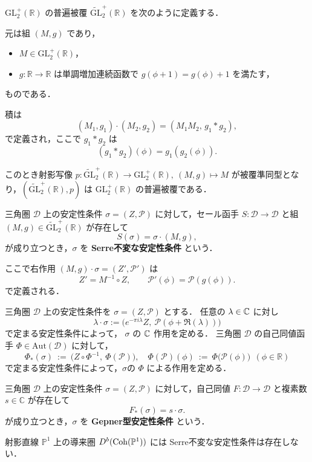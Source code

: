 \section{}
\begin{defn}
$\mathrm{GL}^+_2(\mathbb{R})$ の普遍被覆 $\widetilde{\mathrm{GL}}^+_2(\mathbb{R})$ を次のように定義する．

元は組 $(M,g)$ であり，
\begin{itemize}
  \item $M \in \mathrm{GL}^+_2(\mathbb{R})$，
  \item $g:\mathbb{R}\to\mathbb{R}$ は単調増加連続函数で $g(\phi+1)=g(\phi)+1$ を満たす，
\end{itemize}
ものである．

積は
\[
(M_1,g_1)\cdot(M_2,g_2) = (M_1M_2,\, g_1\ast g_2),
\]
で定義され，ここで $g_1\ast g_2$ は
\[
(g_1\ast g_2)(\phi) = g_1(g_2(\phi)).
\]

このとき射影写像 $p:\widetilde{\mathrm{GL}}^+_2(\mathbb{R})\to \mathrm{GL}^+_2(\mathbb{R}),\ (M,g)\mapsto M$ が被覆準同型となり，$(\widetilde{\mathrm{GL}}^+_2(\mathbb{R}),p)$ は $\mathrm{GL}^+_2(\mathbb{R})$ の普遍被覆である．
\end{defn}

\begin{defn}
三角圏 $\mathcal{D}$ 上の安定性条件 $\sigma=(Z,\mathcal{P})$ に対して，セール函手 $S:\mathcal{D}\to\mathcal{D}$ と組 $(M,g)\in \widetilde{\mathrm{GL}}^+_2(\mathbb{R})$ が存在して
\[
S(\sigma)=\sigma \cdot (M,g),
\]
が成り立つとき，$\sigma$ を \textbf{Serre不変な安定性条件} という．

ここで右作用 $(M,g)\cdot\sigma=(Z',\mathcal{P}')$ は
\[
	Z' = M^{-1}\circ Z,\qquad 
\mathcal{P}'(\phi)=\mathcal{P}(g(\phi)).
\]
で定義される．
\end{defn}

\begin{defn}
三角圏 $\mathcal{D}$ 上の安定性条件を $\sigma=(Z,\mathcal{P})$ とする．
任意の $\lambda\in {\mathbb C}$ に対し
\[
\lambda\cdot\sigma := \bigl(e^{-\pi i \lambda}Z,\ \mathcal{P}(\phi+\Re(\lambda))\bigr)
\]
で定まる安定性条件によって， $\sigma$ の ${\mathbb C}$ 作用を定める．
三角圏 $\mathcal{D}$ の自己同値函手 $\Phi\in \mathrm{Aut}(\mathcal{D})$ に対して，
\[
\Phi_*(\sigma)\ :=\ \bigl(Z\circ \Phi^{-1},\ \Phi(\mathcal{P})\bigr),\quad
\Phi(\mathcal{P})(\phi)\ :=\ \Phi\bigl(\mathcal{P}(\phi)\bigr)\ \ (\phi\in\mathbb{R})
\]
で定まる安定性条件によって，$\sigma$の $\Phi$ による作用を定める．
\end{defn}

\begin{defn}
三角圏 $\mathcal{D}$ 上の安定性条件 $\sigma=(Z,\mathcal{P})$ に対して，自己同値 $F:\mathcal{D}\to\mathcal{D}$ と複素数 $s\in\mathbb{C}$ が存在して
\[
	F_*(\sigma)=s\cdot \sigma.
\]
が成り立つとき，$\sigma$ を \textbf{Gepner型安定性条件} という．
\end{defn}


\begin{thm}
	射影直線 \(\mathbb{P}^1\) 上の導来圏 \(D^b(\operatorname{\mathrm{Coh}}({\mathbb P}^1))\) には Serre不変な安定性条件は存在しない．
\end{thm}
